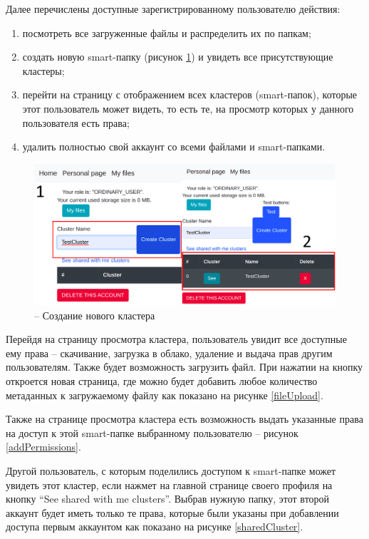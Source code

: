 Далее перечислены доступные зарегистрированному пользователю действия:
\begin{enumerate}
\item посмотреть все загруженные файлы и распределить их по папкам;
\item создать новую smart-папку (рисунок \ref{personalPageMvp}) и увидеть все присутствующие кластеры;
\item перейти на страницу с отображением всех кластеров (smart-папок), которые этот пользователь может видеть, то есть те, на просмотр которых у данного пользователя есть права;
\item удалить полностью свой аккаунт со всеми файлами и smart-папками.
\end{enumerate}

\begin{figure}[H]
    \centering
    \includegraphics[scale=0.27]{images/mvp/1_CreateNewCluster.png}
    \caption{-- Создание нового кластера}
    \label{personalPageMvp}
\end{figure}

Перейдя на страницу просмотра кластера, пользователь увидит все доступные ему права – скачивание, загрузка в облако, удаление и выдача прав другим пользователям. Также будет возможность загрузить файл. При нажатии на кнопку  откроется новая страница, где можно будет добавить любое количество метаданных к загружаемому файлу как показано на рисунке \ref{fileUpload}.

Также на странице просмотра кластера есть возможность выдать указанные права на доступ к этой smart-папке выбранному пользователю -- рисунок \ref{addPermissions}.

Другой пользователь, с которым поделились доступом к smart-папке может увидеть этот кластер, если нажмет на главной странице своего профиля на кнопку “See shared with me clusters”. Выбрав нужную папку, этот второй аккаунт будет иметь только те права, которые были указаны при добавлении доступа первым аккаунтом как показано на рисунке \ref{sharedCluster}.

